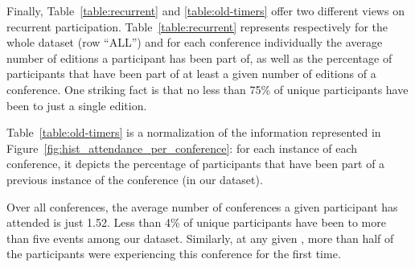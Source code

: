 Finally, Table~\ref{table:recurrent} and \ref{table:old-timers} offer two
different views on recurrent participation. Table~\ref{table:recurrent}
represents respectively for the whole dataset (row ``ALL'') and for each
conference individually the average number of editions a participant has
been part of, as well as the percentage of participants that have been part
of at least a given number of editions of a conference. One striking fact is
that no less than 75\% of unique participants have been to just a single
edition.

Table~\ref{table:old-timers} is a normalization of the information represented
in Figure~\ref{fig:hist_attendance_per_conference}: for each instance of each
conference, it depicts the percentage of participants that have been part of a
previous instance of the conference (in our dataset).

\begin{obs}
Over all conferences, the average number of conferences a given participant
has attended is just 1.52. Less than 4\% of unique participants have been to
more than five events among our dataset.  Similarly, at any given \event,
more than half of the participants were experiencing this conference for the
first time.
\label{obs:old-timers}
\end{obs}


